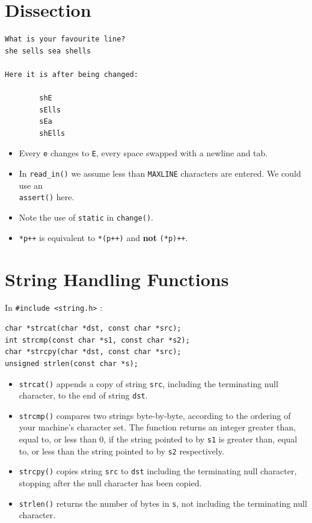 \documentclass[a4,portraitt]{slides}
\begin{document}
\newpage
{\samepage
\section*{Dissection}
\begin{verbatim}
What is your favourite line?
she sells sea shells

Here it is after being changed:

        shE
        sElls
        sEa
        shElls
\end{verbatim}
\begin{itemize}
\item Every \verb^e^ changes to \verb^E^, every space swapped
with a newline and tab.
\item In \verb^read_in()^ we assume less than \verb^MAXLINE^ characters
are entered. We could use an\\ \verb^assert()^ here.
\item Note the use of \verb^static^ in \verb^change()^.
\item \verb^*p++^ is equivalent to \verb^*(p++)^ and {\bf not}
\verb^(*p)++^.
\end{itemize}
}
\newpage
\section*{String Handling Functions}
In \verb^#include <string.h>^ :
{\small
\begin{verbatim}
char *strcat(char *dst, const char *src);
int strcmp(const char *s1, const char *s2);
char *strcpy(char *dst, const char *src);
unsigned strlen(const char *s);
\end{verbatim}
}
\begin{itemize}
\item \verb^strcat()^ appends a copy of string \verb^src^,
including  the  terminating null character,
to  the  end  of  string  \verb^dst^.
\item \verb^strcmp()^ compares two strings byte-by-byte, according to the
     ordering  of  your  machine's  character  set.  The function
     returns an integer greater than, equal to, or less  than  0,
     if the string pointed to by \verb^s1^ is greater than, equal to, or
     less than the string pointed to by \verb^s2^ respectively.
\item \verb^strcpy()^ copies string \verb^src^ to \verb^dst^
including the  terminating null  character,
stopping after the null character has been copied.
\item \verb^strlen()^ returns the number of bytes in \verb^s^,
not including the terminating null character.
\end{itemize}
\end{document}
